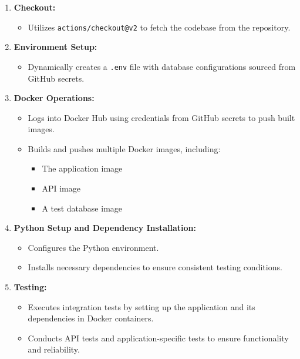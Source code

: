 \documentclass[12pt, a4paper, oneside]{book}
\begin{document}
\begin{enumerate}
    \item \textbf{Checkout:} 
    \begin{itemize}
        \item Utilizes \texttt{actions/checkout@v2} to fetch the codebase from the repository.
    \end{itemize}
    
    \item \textbf{Environment Setup:} 
    \begin{itemize}
        \item Dynamically creates a \texttt{.env} file with database configurations sourced from GitHub secrets.
    \end{itemize}
    
    \item \textbf{Docker Operations:}
    \begin{itemize}
        \item Logs into Docker Hub using credentials from GitHub secrets to push built images.
        \item Builds and pushes multiple Docker images, including:
        \begin{itemize}
            \item The application image
            \item API image
            \item A test database image
        \end{itemize}
    \end{itemize}
    
    \item \textbf{Python Setup and Dependency Installation:}
    \begin{itemize}
        \item Configures the Python environment.
        \item Installs necessary dependencies to ensure consistent testing conditions.
    \end{itemize}
    
    \item \textbf{Testing:}
    \begin{itemize}
        \item Executes integration tests by setting up the application and its dependencies in Docker containers.
        \item Conducts API tests and application-specific tests to ensure functionality and reliability.
    \end{itemize}
\end{enumerate}
\end{document}
